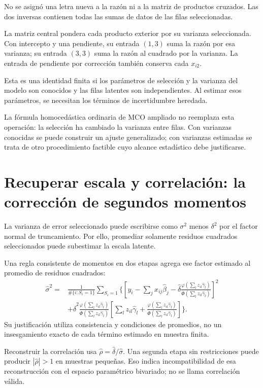 \documentclass[11pt,a4paper]{article}
\begin{document}
No se asignó una letra nueva a la razón ni a la matriz de
productos cruzados. Las dos inversas contienen todas las
sumas de datos de las filas seleccionadas.

La matriz central pondera cada producto exterior
por su varianza seleccionada. Con intercepto y una pendiente,
su entrada \((1,3)\) suma la razón por esa varianza;
su entrada \((3,3)\) suma la razón al cuadrado por la varianza.
La entrada de pendiente por corrección también conserva
cada \(x_{i2}\).

Esta es una identidad finita si los parámetros de selección
y la varianza del modelo son conocidos y las filas latentes
son independientes. Al estimar esos parámetros,
se necesitan los términos de incertidumbre heredada.

La fórmula homocedástica ordinaria de MCO ampliado no reemplaza
esta operación: la selección ha cambiado la varianza entre filas.
Con varianzas conocidas se puede construir un ajuste generalizado;
con varianzas estimadas se trata de otro procedimiento factible
cuyo alcance estadístico debe justificarse.


\clearpage
\section{Recuperar escala y correlación: la corrección de segundos momentos}\label{unidad132}
La varianza de error seleccionado
puede escribirse como \(\sigma^2\)
menos \(\delta^2\) por el
factor normal de truncamiento.
Por ello, promediar solamente
residuos cuadrados seleccionados
puede subestimar la escala latente.

Una regla consistente de momentos
en dos etapas agrega ese
factor estimado al promedio
de residuos cuadrados:
\[
\begin{aligned}
\widehat\sigma^2
={}&\frac1{\#\{i:S_i=1\}}\sum_{S_i=1}
\Bigg\{
\left[y_i-\sum_jx_{ij}\widehat\beta_j
-\widehat\delta
\frac{\varphi(\sum_lz_{il}\widehat\gamma_l)}
{\Phi(\sum_lz_{il}\widehat\gamma_l)}\right]^2\\
&+\widehat\delta^2
\frac{\varphi(\sum_lz_{il}\widehat\gamma_l)}
{\Phi(\sum_lz_{il}\widehat\gamma_l)}
\left[
\sum_lz_{il}\widehat\gamma_l+
\frac{\varphi(\sum_lz_{il}\widehat\gamma_l)}
{\Phi(\sum_lz_{il}\widehat\gamma_l)}
\right]\Bigg\}.
\end{aligned}
\]
Su justificación utiliza consistencia
y condiciones de promedios,
no un insesgamiento exacto
de cada término estimado en muestra finita.

Reconstruir la correlación usa
\(\widehat\rho=\widehat\delta/\widehat\sigma\).
Una segunda etapa sin restricciones
puede producir \(|\widehat\rho|>1\)
en muestras pequeñas.
Eso indica incompatibilidad de
esa reconstrucción con el
espacio paramétrico bivariado;
no se llama correlación válida.
\end{document}
